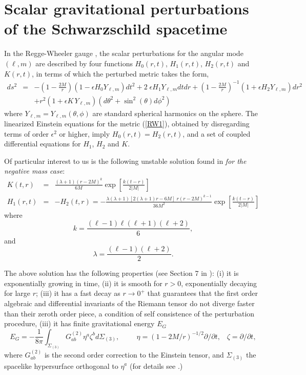\documentclass[aps,floats,showpacs,amssymb,tightenlines]{revtex4}
\def\e{\epsilon}
\begin{document}
\section{Scalar gravitational perturbations of the Schwarzschild spacetime}\label{rw}
  In the Regge-Wheeler gauge \cite{rw}, the scalar
perturbations for the angular mode $(\ell,m)$  are
described by  four functions $H_0(r,t)$, $H_1(r,t)$, $H_2(r,t)$ and
$K(r,t)$, in terms of which the perturbed metric takes the form,
\begin{eqnarray}
\label{RW1}
ds^2 & = & -\left(1-\frac{2M}{r}\right)\left(1- \e H_0 Y_{\ell,m}\right)dt^2 +
2  \; \e  H_1 Y_{\ell,m} dt dr+\left(1-\frac{2M}{r}\right)^{-1}\left(1+ \e H_2 Y_{\ell,m}\right)dr^2
\nonumber \\
& & +r^2\left(1+ \e  K\, Y_{\ell,m}\right) \left( d \theta^2 +  \sin^2(\theta)
d \phi^2 \right)
\end{eqnarray}
where  
$Y_{\ell,m}=  Y_{\ell,m}(\theta,\phi)$ are standard spherical
harmonics on the sphere.
The linearized Einstein equations for the
metric (\ref{RW1}), obtained by disregarding terms of order $\e^2$ or higher,
 imply $H_0(r,t)=H_2(r,t)$, and a set of coupled
differential equations for $H_1$, $H_2$ and $K$.

Of particular interest to us is the following unstable solution  found in \cite{dg}  {\em for the negative mass case}:
\begin{eqnarray}
\label{RW24a}
 K(t,r) & = & \frac{ (\lambda + 1)(r-2M)^{k }}{6M}\exp \left[\frac{k(t- r)}{2|M|}\right]   \\
 H_1(r,t) & = & -H_2(t,r) = -\frac{\lambda (\lambda+1)
   [2(\lambda+1) r-6M] \; r  (r-2M)^{k-1}}{36M^2}  \exp \left[\frac{k(t- r)}{2|M|}\right] \nonumber
\end{eqnarray}
where
\begin{equation} \label{k}
k =\frac{ (\ell-1) \ell (\ell+1) (\ell+2)} {6}  ,
\end{equation}
and
\begin{equation} \label{lam}
\lambda =  \frac{(\ell-1)(\ell+2)}{2} .
\end{equation}

The above solution has the following properties (see Section 7 in \cite{dg}): (i) it is exponentially growing in time, 
(ii) it is smooth for $r>0$,
 exponentially decaying for large $r$;
(iii) it has a fast decay as $r \to 0^+$ that guarantees that the first order algebraic and 
differential invariants of the Riemann
tensor do not diverge faster than their zeroth order piece, a condition 
of self consistence of the perturbation procedure, (iii)
it has finite gravitational energy $E_G$
\begin{equation} \label{eg}
E_G = - \frac{1}{8 \pi} \int_{\Sigma_{(3)}} G^{(2)}_{ab} \eta^a \zeta^b d
\Sigma_{(3)},\hspace{1cm}\eta = (1-2M/r)^{-1/2} \partial / \partial t,
\;\;\; \zeta = \partial / \partial t,
\end{equation}
where $G^{(2)}_{ab} $ is the second order correction to the Einstein
tensor, and $\Sigma_{(3)}$ the spacelike hypersurface orthogonal to $\eta^a$ (for details
see \cite{ghi,dg,chandra}.)
\end{document}
